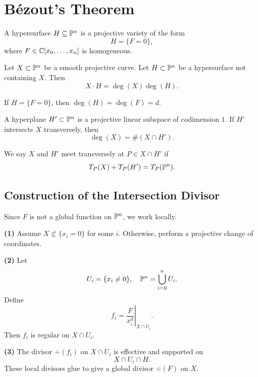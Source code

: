 
\section{Bézout's Theorem}

\begin{definition}[Hypersurface]
    A hypersurface $H \subseteq \mathbb{P}^n$ is a projective variety of the form
    \[
        H = \{F = 0\},
    \]
    where $F \in \mathbb{C}[x_0,\ldots,x_n]$ is homogeneous.
\end{definition}

\begin{theorem*}{
    Let $X \subset \mathbb{P}^n$ be a smooth projective curve.
    Let $H \subset \mathbb{P}^n$ be a hypersurface not containing $X$.
    Then
    \[
        X \cdot H = \deg(X)\deg(H).
    \]
}
\end{theorem*}

If $H = \{F = 0\}$, then $\deg(H) = \deg(F) = d$.

\begin{definition}[Hyperplane]
    A hyperplane $H' \subset \mathbb{P}^n$ is a projective linear subspace of codimension $1$.
    If $H'$ intersects $X$ transversely, then
    \[
        \deg(X) = \#(X \cap H').
    \]
\end{definition}

\begin{definition}
    We say $X$ and $H'$ meet transversely at $P \in X \cap H'$ if
    \[
        T_P(X) + T_P(H') = T_P(\mathbb{P}^n).
    \]
\end{definition}

\subsection*{Construction of the Intersection Divisor}

Since $F$ is not a global function on $\mathbb{P}^n$, we work locally.

\textbf{(1)} Assume $X \not\subset \{x_i = 0\}$ for some $i$.
Otherwise, perform a projective change of coordinates.

\textbf{(2)} Let
\[
    U_i = \{x_i \neq 0\}, \quad \mathbb{P}^n = \bigcup_{i=0}^n U_i.
\]
Define
\[
    f_i = \left.\frac{F}{x_i^d}\right|_{X \cap U_i}.
\]
Then $f_i$ is regular on $X \cap U_i$.

\textbf{(3)} The divisor $\div(f_i)$ on $X \cap U_i$ is effective and supported on
\[
    X \cap U_i \cap H.
\]
These local divisors glue to give a global divisor $\div(F)$ on $X$.


